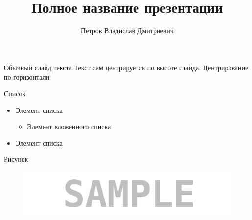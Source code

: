\documentclass[11pt]{beamer}
\author[Петров В.Д.]{Петров Владислав Дмитриевич}
\title[Краткое название]{Полное название презентации}
\date{\the\year}
\begin{document}
\begin{frame}
\titlepage
\end{frame}


\begin{frame}{Обычный слайд текста}
Текст сам центрируется по высоте слайда. Центрирование по горизонтали 
\end{frame}


\begin{frame}{Список}
\begin{itemize}
	\item Элемент списка
	\begin{itemize}
		\item Элемент вложенного списка
	\end{itemize}
	\item Элемент списка
\end{itemize}
\end{frame}


\begin{frame}{Рисунок}
\begin{figure}[H]
	\includegraphics[scale=0.4]{pics/sample}
	\label{fig:sample}
\end{figure}
\end{frame}
\end{document}
